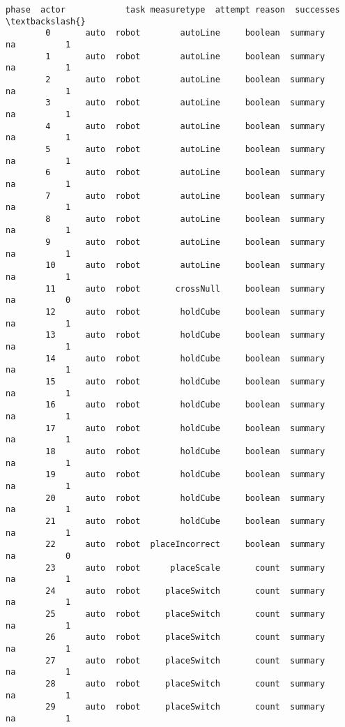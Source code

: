 \documentclass[11pt]{article}
\begin{document}
\begin{Verbatim}[commandchars=\\\{\}]
               phase  actor            task measuretype  attempt reason  successes  \textbackslash{}
        0       auto  robot        autoLine     boolean  summary     na          1   
        1       auto  robot        autoLine     boolean  summary     na          1   
        2       auto  robot        autoLine     boolean  summary     na          1   
        3       auto  robot        autoLine     boolean  summary     na          1   
        4       auto  robot        autoLine     boolean  summary     na          1   
        5       auto  robot        autoLine     boolean  summary     na          1   
        6       auto  robot        autoLine     boolean  summary     na          1   
        7       auto  robot        autoLine     boolean  summary     na          1   
        8       auto  robot        autoLine     boolean  summary     na          1   
        9       auto  robot        autoLine     boolean  summary     na          1   
        10      auto  robot        autoLine     boolean  summary     na          1   
        11      auto  robot       crossNull     boolean  summary     na          0   
        12      auto  robot        holdCube     boolean  summary     na          1   
        13      auto  robot        holdCube     boolean  summary     na          1   
        14      auto  robot        holdCube     boolean  summary     na          1   
        15      auto  robot        holdCube     boolean  summary     na          1   
        16      auto  robot        holdCube     boolean  summary     na          1   
        17      auto  robot        holdCube     boolean  summary     na          1   
        18      auto  robot        holdCube     boolean  summary     na          1   
        19      auto  robot        holdCube     boolean  summary     na          1   
        20      auto  robot        holdCube     boolean  summary     na          1   
        21      auto  robot        holdCube     boolean  summary     na          1   
        22      auto  robot  placeIncorrect     boolean  summary     na          0   
        23      auto  robot      placeScale       count  summary     na          1   
        24      auto  robot     placeSwitch       count  summary     na          1   
        25      auto  robot     placeSwitch       count  summary     na          1   
        26      auto  robot     placeSwitch       count  summary     na          1   
        27      auto  robot     placeSwitch       count  summary     na          1   
        28      auto  robot     placeSwitch       count  summary     na          1   
        29      auto  robot     placeSwitch       count  summary     na          1   

\end{Verbatim}
\end{document}
